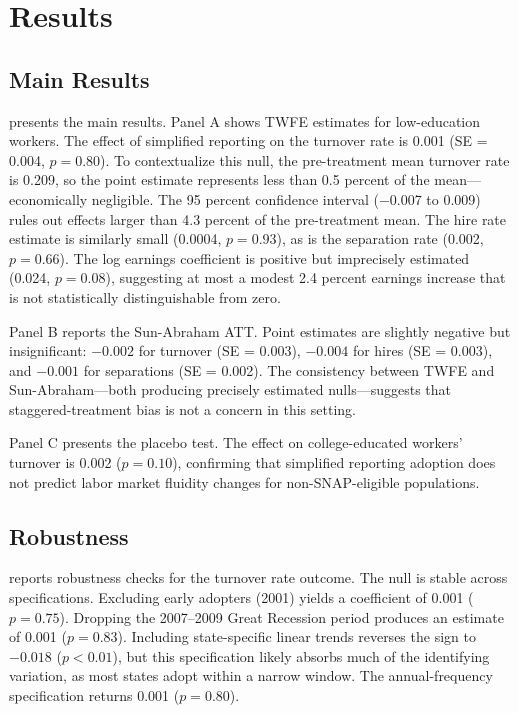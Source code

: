 \documentclass[12pt]{article}
\begin{document}
\section{Results}

\subsection{Main Results}



 presents the main results. Panel A shows TWFE estimates for low-education workers. The effect of simplified reporting on the turnover rate is 0.001 (SE = 0.004, $p = 0.80$). To contextualize this null, the pre-treatment mean turnover rate is 0.209, so the point estimate represents less than 0.5 percent of the mean---economically negligible. The 95 percent confidence interval ($-$0.007 to 0.009) rules out effects larger than 4.3 percent of the pre-treatment mean. The hire rate estimate is similarly small (0.0004, $p = 0.93$), as is the separation rate (0.002, $p = 0.66$). The log earnings coefficient is positive but imprecisely estimated (0.024, $p = 0.08$), suggesting at most a modest 2.4 percent earnings increase that is not statistically distinguishable from zero.

Panel B reports the Sun-Abraham ATT. Point estimates are slightly negative but insignificant: $-0.002$ for turnover (SE = 0.003), $-0.004$ for hires (SE = 0.003), and $-0.001$ for separations (SE = 0.002). The consistency between TWFE and Sun-Abraham---both producing precisely estimated nulls---suggests that staggered-treatment bias is not a concern in this setting.

Panel C presents the placebo test. The effect on college-educated workers' turnover is 0.002 ($p = 0.10$), confirming that simplified reporting adoption does not predict labor market fluidity changes for non-SNAP-eligible populations.

\subsection{Robustness}



 reports robustness checks for the turnover rate outcome. The null is stable across specifications. Excluding early adopters (2001) yields a coefficient of 0.001 ($p = 0.75$). Dropping the 2007--2009 Great Recession period produces an estimate of 0.001 ($p = 0.83$). Including state-specific linear trends reverses the sign to $-0.018$ ($p < 0.01$), but this specification likely absorbs much of the identifying variation, as most states adopt within a narrow window. The annual-frequency specification returns 0.001 ($p = 0.80$).
\end{document}
